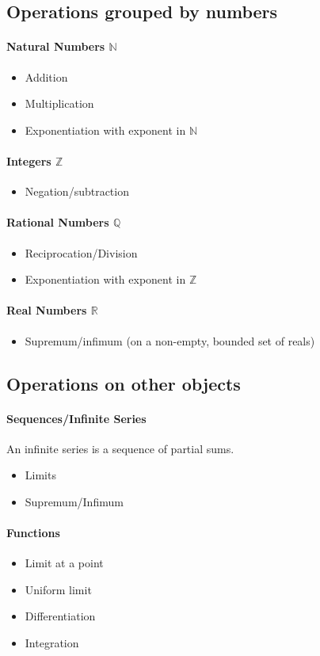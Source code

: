 \documentclass{article}
\newcommand{\real}{{\mathbb{R}}}
\begin{document}
\subsection*{Operations grouped by numbers}
\begin{multicols}{2}

\paragraph{Natural Numbers $\mathbb{N}$}
\begin{itemize}
    \item Addition
    \item Multiplication
    \item Exponentiation with exponent in $\mathbb{N}$
\end{itemize}
\paragraph{Integers $\mathbb{Z}$}
\begin{itemize}
    \item Negation/subtraction
\end{itemize}

\columnbreak

\paragraph{Rational Numbers $\mathbb{Q}$}
\begin{itemize}
    \item Reciprocation/Division
    \item Exponentiation with exponent in $\mathbb{Z}$
\end{itemize}
\paragraph{Real Numbers $\real$}
\begin{itemize}
    \item Supremum/infimum (on a non-empty, bounded set of reals)
\end{itemize}

\end{multicols}

\subsection*{Operations on other objects}
\paragraph{Sequences/Infinite Series}
An infinite series is a sequence of partial sums.
\begin{itemize}
\item Limits
\item Supremum/Infimum
\end{itemize}

\paragraph{Functions}
\begin{itemize}
\item Limit at a point
\item Uniform limit
\item Differentiation
\item Integration
\end{itemize}
\end{document}
